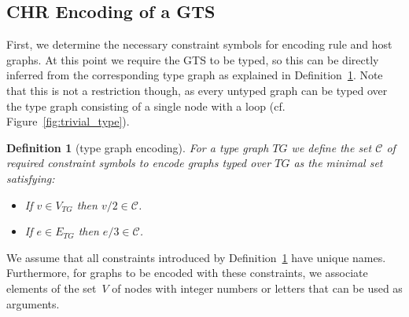 \documentclass{tlp}
\newtheorem{definition}{Definition}[section]
\begin{document}
\subsection{CHR Encoding of a GTS}
\label{sec:default_encoding}

First, we determine the necessary constraint symbols for encoding rule and host
graphs. At this point we require the GTS to be typed, so this can be directly
inferred from the corresponding type graph as explained in
Definition~\ref{def:constraints_i}. Note that this is not a restriction though,
as every untyped graph can be typed over the type graph consisting of a single
node with a loop (cf. Figure~\ref{fig:trivial_type}).

\begin{definition}[type graph encoding] \label{def:constraints_i}
For a type graph $TG$ we define the set $\mathcal{C}$ of required constraint
symbols to encode graphs typed over $TG$ as the minimal set satisfying:
\begin{itemize}
  \item If $v \in V_{TG}$ then $v/2 \in \mathcal{C}$.
  \item If $e \in E_{TG}$ then $e/3 \in \mathcal{C}$.
\end{itemize}
\end{definition}

We assume that all constraints introduced by Definition~\ref{def:constraints_i}
have unique names. Furthermore, for graphs to be encoded with these constraints,
we associate elements of the set~$V$ of nodes with integer numbers or letters
that can be used as arguments.
\end{document}

